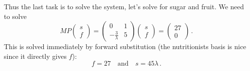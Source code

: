 {Thus the last task is to solve the system, let's solve for sugar and fruit. 
We need to solve
\[
MP\begin{pmatrix} s \\  f\end{pmatrix}
=\begin{pmatrix}0& 1\\ -\frac3\lambda & 5
\end{pmatrix}
\begin{pmatrix} s \\  f\end{pmatrix}
=\begin{pmatrix}27\\0\end{pmatrix}
\, .
\]
This is solved immediately by forward substitution (the nutritionists basis is nice since it directly gives $f$):
\[
f=27\quad \mbox{and} \quad s= 45\lambda\, .
\]

} %

